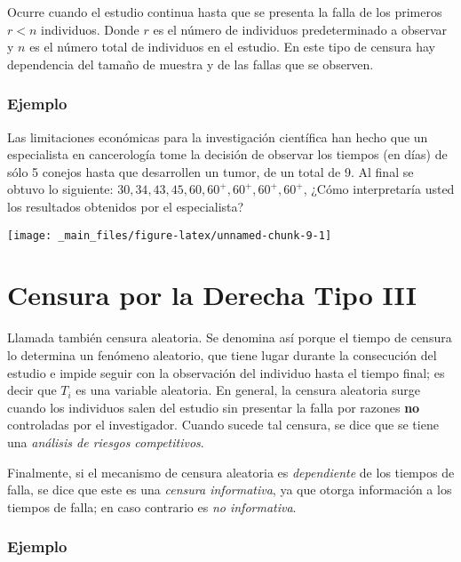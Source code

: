 \documentclass[
  a4paper,
  oneside,
  openany]{book}
\begin{document}
Ocurre cuando el estudio continua hasta que se presenta la falla de los primeros \(r<n\) individuos. Donde \(r\) es el número de individuos predeterminado a observar y \(n\) es el número total de individuos en el estudio. En este tipo de censura hay dependencia del tamaño de muestra y de las fallas que se observen.

\hypertarget{ejemplo-1}{%
\subsubsection*{Ejemplo}\label{ejemplo-1}}


Las limitaciones económicas para la investigación científica han hecho que un especialista en cancerología tome la decisión de observar los tiempos (en días) de sólo 5 conejos hasta que desarrollen un tumor, de un total de 9. Al final se obtuvo lo siguiente: \(30,34,43,45,60,60^+,60^+,60^+,60^+\), ¿Cómo interpretaría usted los resultados obtenidos por el especialista?

\begin{center}\texttt{[image: \_main\_files/figure-latex/unnamed-chunk-9-1]} \end{center}

\hypertarget{censura-por-la-derecha-tipo-iii}{%
\section{Censura por la Derecha Tipo III}\label{censura-por-la-derecha-tipo-iii}}

Llamada también censura aleatoria. Se denomina así porque el tiempo de censura lo determina un fenómeno aleatorio, que tiene lugar durante la consecución del estudio e impide seguir con la observación del individuo hasta el tiempo final; es decir que \(T_i\) es una variable aleatoria. En general, la censura aleatoria surge cuando los individuos salen del estudio sin presentar la falla por razones \textbf{no} controladas por el investigador. Cuando sucede tal censura, se dice que se tiene una \emph{análisis de riesgos competitivos}.

Finalmente, si el mecanismo de censura aleatoria es \emph{dependiente} de los tiempos de falla, se dice que este es una \emph{censura informativa}, ya que otorga información a los tiempos de falla; en caso contrario es \emph{no informativa}.

\hypertarget{ejemplo-2}{%
\subsubsection*{Ejemplo}\label{ejemplo-2}}
\end{document}
